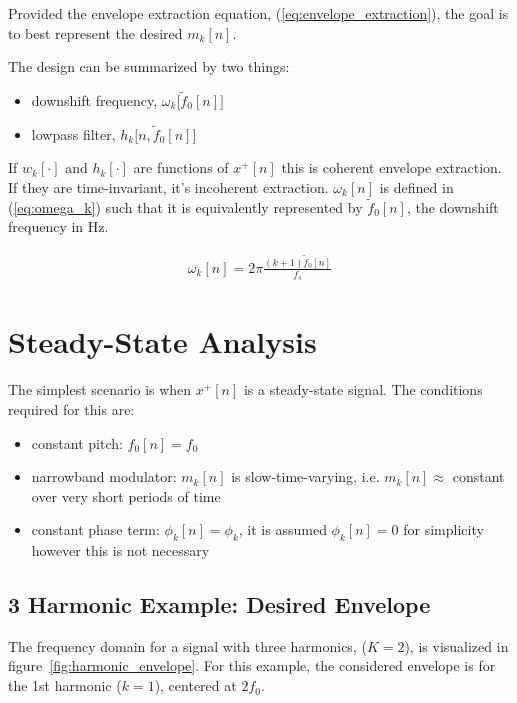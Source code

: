 \documentclass [11pt, proquest,oneside] {ganter_thesis}[2015/03/03]
\begin{document}
Provided the envelope extraction equation, (\ref{eq:envelope_extraction}), the goal is to best represent the desired $m_k[n]$.

The design can be summarized by two things:

\begin{itemize}
\setlength\itemsep{0em}
\item downshift frequency, $\omega_k\big[\tilde{f}_0[n]\big]$
\item lowpass filter, $h_k\big[n,\tilde{f}_0[n]\big]$
\end{itemize}

If $w_k[\cdot]$ and $h_k[\cdot]$ are functions of $x^+[n]$ this is coherent envelope extraction.  If they are time-invariant, it's incoherent extraction.  $\omega_k[n]$ is defined in (\ref{eq:omega_k}) such that it is equivalently represented by $\tilde{f}_0[n]$, the downshift frequency in Hz.

\begin{align}
\label{eq:omega_k}
\omega_k[n] = 2\pi \frac{(k+1)\tilde{f}_0[n]}{f_s}
\end{align}

\section{Steady-State Analysis}

The simplest scenario is when $x^+[n]$ is a steady-state signal.  The conditions required for this are:

\begin{itemize}
\setlength\itemsep{0em}
\item constant pitch: $f_0[n] = f_0$
\item narrowband modulator: $m_k[n]$ is slow-time-varying, i.e. $m_k[n] \approx$ constant over very short periods of time
\item constant phase term: $\phi_k[n] = \phi_k$, it is assumed $\phi_k[n] = 0$ for simplicity however this is not necessary
\end{itemize}

\subsection{3 Harmonic Example: Desired Envelope}

The frequency domain for a signal with three harmonics, ($K = 2$), is visualized in figure~\ref{fig:harmonic_envelope}.  For this example, the considered envelope is for the 1st harmonic ($k = 1$), centered at $2f_0$.
\end{document}
